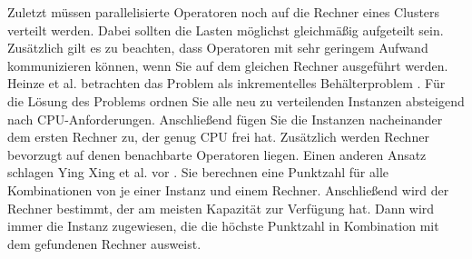 Zuletzt müssen parallelisierte Operatoren noch auf die Rechner eines Clusters verteilt werden.
Dabei sollten die Lasten möglichst gleichmäßig aufgeteilt sein.
Zusätzlich gilt es zu beachten, dass Operatoren mit sehr geringem Aufwand kommunizieren können, wenn Sie auf dem gleichen Rechner ausgeführt werden.
Heinze et al. betrachten das Problem als inkrementelles Behälterproblem \cite{heinze_latency-aware_2014}.
Für die Lösung des Problems ordnen Sie alle neu zu verteilenden Instanzen absteigend nach CPU-Anforderungen.
Anschließend fügen Sie die Instanzen nacheinander dem ersten Rechner zu, der genug CPU frei hat.
Zusätzlich werden Rechner bevorzugt auf denen benachbarte Operatoren liegen.
Einen anderen Ansatz schlagen Ying Xing et al. vor \cite{ying_xing_dynamic_2005}.
Sie berechnen eine Punktzahl für alle Kombinationen von je einer Instanz und einem Rechner.
Anschließend wird der Rechner bestimmt, der am meisten Kapazität zur Verfügung hat.
Dann wird immer die Instanz zugewiesen, die die höchste Punktzahl in Kombination mit dem gefundenen Rechner ausweist.


